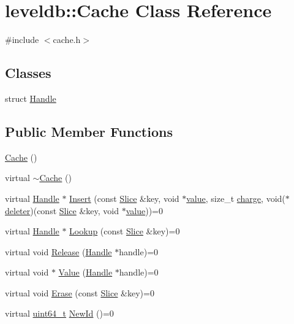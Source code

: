 \hypertarget{classleveldb_1_1_cache}{\section{leveldb\-:\-:Cache Class Reference}
\label{classleveldb_1_1_cache}
}


{\ttfamily \#include $<$cache.\-h$>$}

\subsection*{Classes}
\begin{DoxyCompactItemize}
\item 
struct \hyperlink{structleveldb_1_1_cache_1_1_handle}{Handle}
\end{DoxyCompactItemize}
\subsection*{Public Member Functions}
\begin{DoxyCompactItemize}
\item 
\hyperlink{classleveldb_1_1_cache_ac9b129b21ba8eda181645fc3f6a8dfe6}{Cache} ()
\item 
virtual \hyperlink{classleveldb_1_1_cache_a1369f94b24a31099443f714b8b8ab527}{$\sim$\-Cache} ()
\item 
virtual \hyperlink{structleveldb_1_1_cache_1_1_handle}{Handle} $\ast$ \hyperlink{classleveldb_1_1_cache_af0b55b7fa0e64184fa62e0dbe9ba9eae}{Insert} (const \hyperlink{classleveldb_1_1_slice}{Slice} \&key, void $\ast$\hyperlink{cache_8cc_a0f61d63b009d0880a89c843bd50d8d76}{value}, size\-\_\-t \hyperlink{cache_8cc_a7476acc4f60747f9d9032e9cbdf5eb79}{charge}, void($\ast$\hyperlink{cache_8cc_a2de9431c71caf9c05081754cfe130a6d}{deleter})(const \hyperlink{classleveldb_1_1_slice}{Slice} \&key, void $\ast$\hyperlink{cache_8cc_a0f61d63b009d0880a89c843bd50d8d76}{value}))=0
\item 
virtual \hyperlink{structleveldb_1_1_cache_1_1_handle}{Handle} $\ast$ \hyperlink{classleveldb_1_1_cache_af90785205182a25cf741dc13a48d76cb}{Lookup} (const \hyperlink{classleveldb_1_1_slice}{Slice} \&key)=0
\item 
virtual void \hyperlink{classleveldb_1_1_cache_a712618c8bf3bfa48b7bab1fbc23c3002}{Release} (\hyperlink{structleveldb_1_1_cache_1_1_handle}{Handle} $\ast$handle)=0
\item 
virtual void $\ast$ \hyperlink{classleveldb_1_1_cache_a454920df8e68917adcf011dfb3538661}{Value} (\hyperlink{structleveldb_1_1_cache_1_1_handle}{Handle} $\ast$handle)=0
\item 
virtual void \hyperlink{classleveldb_1_1_cache_af833a38763598253338de37aba079db6}{Erase} (const \hyperlink{classleveldb_1_1_slice}{Slice} \&key)=0
\item 
virtual \hyperlink{stdint_8h_aaa5d1cd013383c889537491c3cfd9aad}{uint64\-\_\-t} \hyperlink{classleveldb_1_1_cache_ae2d79bfe747fc6c165c77398cc31e125}{New\-Id} ()=0
\end{DoxyCompactItemize}

